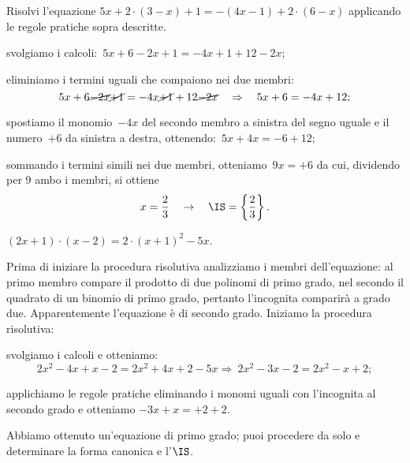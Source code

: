\begin{exrig}
\begin{esempio}
 Risolvi l'equazione $5x+2\cdot (3-x)+1=-(4x-1)+2\cdot (6-x)$ applicando le regole pratiche sopra descritte.
\begin{enumeratea}
 \item svolgiamo i calcoli:~$5x+6-2x+1=-4x+1+12-2x$;
 \item eliminiamo i termini uguali che compaiono nei due membri:
 \[5x+6 \cancel{-2x}\cancel{+1}=-4x \cancel{+1}+12\cancel{-2x}\quad\Rightarrow\quad 5x+6=-4x+12;\]
 \item spostiamo il monomio~$-4x$ del secondo membro a sinistra del segno uguale e il numero~$+6$
da sinistra a destra, ottenendo:~$5x+4x=-6+12$;
\item sommando i termini simili nei due membri, otteniamo~$9x=+6$ da cui, dividendo per 9
 ambo i membri, si ottiene
 \[x=\dfrac{2}{3}\quad\to\quad \IS =\left\{\dfrac{2}{3}\right\}.\]
 \end{enumeratea}
\end{esempio}

 \begin{esempio}

$(2x+1)\cdot (x-2)=2\cdot (x+1)^{2}-5x$.

Prima di iniziare la procedura risolutiva analizziamo i membri
dell'equazione: al primo membro compare il prodotto
di due polinomi di primo grado, nel secondo il quadrato di un binomio
di primo grado, pertanto l'incognita comparirà a grado due. Apparentemente
l'equazione è di secondo grado. Iniziamo la procedura
risolutiva:
\begin{enumeratea}
\item svolgiamo i calcoli e otteniamo:
\[2x^{2}-4x+x-2=2x^{2}+4x+2-5x\Rightarrow~2x^{2}-3x-2=2x^{2}-x+2;\]
\item applichiamo le regole pratiche eliminando i monomi
uguali con l'incognita al secondo grado e otteniamo
$-3x+x=+2+2$.
\end{enumeratea}

Abbiamo ottenuto un'equazione di primo grado; puoi
procedere da solo e determinare la forma canonica e l'$\IS$.

 \end{esempio}
\end{exrig}

\ovalbox{\risolvii \ref{ese:15.2}, \ref{ese:15.3}, \ref{ese:15.4}, \ref{ese:15.5}, \ref{ese:15.6}, \ref{ese:15.7}, \ref{ese:15.8}, \ref{ese:15.9}, \ref{ese:15.10}, \ref{ese:15.11}, \ref{ese:15.12}, \ref{ese:15.13}}


